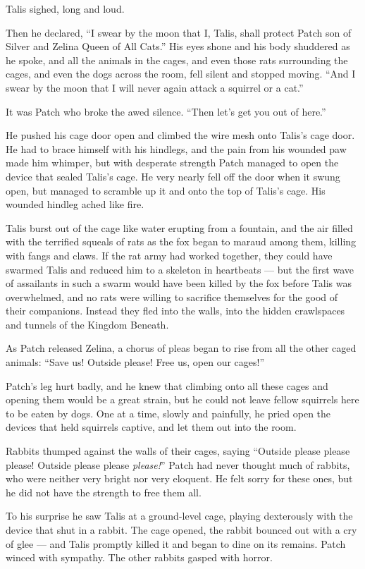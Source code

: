 \documentclass[ebook,oneside,openany,17pt]{memoir}
\begin{document}
Talis sighed, long and loud.

Then he declared, “I swear by the moon that I, Talis, shall protect
Patch son of Silver and Zelina Queen of All Cats.” His eyes shone and
his body shuddered as he spoke, and all the animals in the cages, and
even those rats surrounding the cages, and even the dogs across the
room, fell silent and stopped moving. “And I swear by the moon that I
will never again attack a squirrel or a cat.”

It was Patch who broke the awed silence. “Then let’s get you out of
here.”

He pushed his cage door open and climbed the wire mesh onto Talis’s
cage door. He had to brace himself with his hindlegs, and the pain
from his wounded paw made him whimper, but with desperate strength
Patch managed to open the device that sealed Talis’s cage. He very
nearly fell off the door when it swung open, but managed to scramble
up it and onto the top of Talis’s cage. His wounded hindleg ached like
fire.

Talis burst out of the cage like water erupting from a fountain, and
the air filled with the terrified squeals of rats as the fox began to
maraud among them, killing with fangs and claws. If the rat army had
worked together, they could have swarmed Talis and reduced him to a
skeleton in heartbeats — but the first wave of assailants in such a
swarm would have been killed by the fox before Talis was overwhelmed,
and no rats were willing to sacrifice themselves for the good of their
companions. Instead they fled into the walls, into the hidden
crawlspaces and tunnels of the Kingdom Beneath.

As Patch released Zelina, a chorus of pleas began to rise from all the
other caged animals: “Save us! Outside please! Free us, open our
cages!”

Patch’s leg hurt badly, and he knew that climbing onto all these cages
and opening them would be a great strain, but he could not leave
fellow squirrels here to be eaten by dogs. One at a time, slowly and
painfully, he pried open the devices that held squirrels captive, and
let them out into the room.

Rabbits thumped against the walls of their cages, saying “Outside
please please please! Outside please please \emph{please!}” Patch
had never thought much of rabbits, who were neither very bright nor
very eloquent. He felt sorry for these ones, but he did not have the
strength to free them all.

To his surprise he saw Talis at a ground-level cage, playing
dexterously with the device that shut in a rabbit. The cage opened,
the rabbit bounced out with a cry of glee — and Talis promptly killed
it and began to dine on its remains. Patch winced with sympathy. The
other rabbits gasped with horror.
\end{document}
